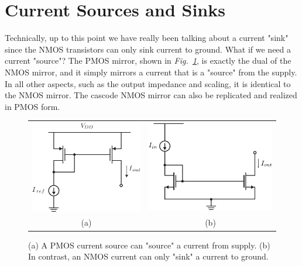 \section{Current Sources and Sinks}
Technically, up to this point we have really been talking about a current "sink" since the NMOS transistors can only sink current to ground.  What if we need a current "source"?  The PMOS mirror, shown in \emph{Fig.~\ref{fig:18mirror_pmos.pdf}}, is exactly the dual of the NMOS mirror, and it simply mirrors a current that is a "source" from the supply.  In all other aspects, such as the output impedance and scaling, it is identical to the NMOS mirror.  The cascode NMOS mirror can also be replicated and realized in PMOS form. 
\begin{figure}[tb]
\centering
\begin{tabular}{cc}
\includegraphics[scale=1]{18mirror_pmos.pdf} &
\includegraphics[scale=1]{nmos_source_mirror}\\ 
(a) & (b)\\
\end{tabular}
\caption{(a) A PMOS current source can "source" a current from supply.  (b) In contrast, an NMOS current can only "sink" a current to ground.}
\label{fig:18mirror_pmos.pdf}
\end{figure}
